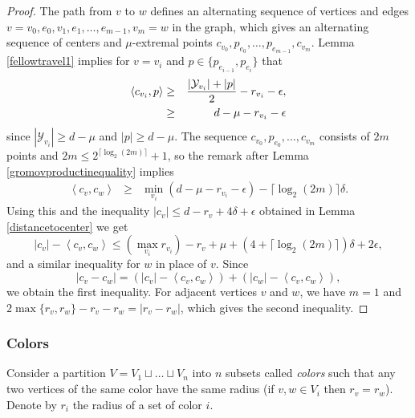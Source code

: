 \documentclass[11pt,letterpaper]{amsart}
\begin{document}
\begin{proof}
The path from $v$ to $w$ defines an alternating sequence of vertices and edges $v=v_0,e_0,v_1,e_1,\dots,e_{m-1},v_m=w$ in the graph, which gives an alternating sequence of centers and $\mu$-extremal points $c_{v_0},p_{e_0},\dots,p_{e_{m-1}},c_{v_m}$.
Lemma \ref{fellowtravel1} implies for $v=v_i$ and $p\in\{p_{e_{i-1}},p_{e_i}\}$ that 
\begin{eqnarray*}
\left<c_{v_i},p\right>&\geq&{|\mathcal Y_{v_i}|+|p|\over 2}-r_{v_i}-\epsilon,\\
&\geq& d-\mu-r_{v_i}-\epsilon
\end{eqnarray*}
since $|\mathcal Y_{v_i}|\geq d-\mu$ and $|p|\geq d-\mu$. 
The sequence $c_{v_0},p_{e_0},\dots,c_{v_m}$ consists of $2m$ points and $2m\leq 2^{\lceil\log_2(2m)\rceil}+1$, so the remark after Lemma \ref{gromovproductinequality} implies 
\begin{eqnarray*}
\left<c_v,c_w\right>&\geq&\min_{v_i} (d-\mu-r_{v_i}-\epsilon)-\lceil\log_2(2m)\rceil\delta.
\end{eqnarray*}
Using this and the inequality $|c_v|\leq d-r_v+4\delta+\epsilon$ obtained in Lemma \ref{distancetocenter} we get
$$
|c_v|-\left<c_v,c_w\right>\leq (\max_{v_i}r_{v_i})-r_v+\mu+(4+\lceil\log_2(2m)\rceil)\delta+2\epsilon,
$$
and a similar inequality for $w$ in place of $v$. Since
$$
|c_v-c_w|=(|c_v|-\left<c_v,c_w\right>)+(|c_w|-\left<c_v,c_w\right>),
$$
we obtain the first inequality. For adjacent vertices $v$ and $w$, we have $m=1$ and $2\max\{r_v,r_w\}-r_v-r_w=|r_v-r_w|$, which gives the second inequality. 
\end{proof}

\subsubsection*{Colors} 
Consider a partition $V=V_1\sqcup\dots\sqcup V_n$ into $n$ subsets called {\it colors} such that any two vertices of the same color have the same radius (if $v,w\in V_i$ then $r_v=r_w$).  Denote by $r_i$ the radius of a set of color $i$. %
\end{document}
